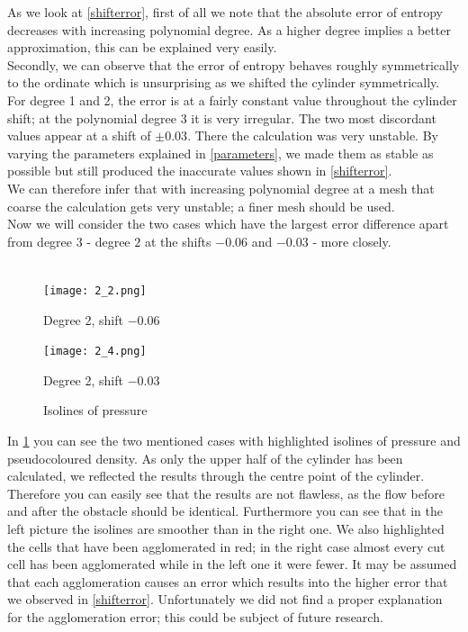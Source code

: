 	As we look at \cref{shifterror}, first of all we note that the absolute error of entropy decreases with increasing polynomial degree. As a higher  degree implies a better approximation, this can be explained very easily. \\ \indent
	Secondly, we can observe that the error of entropy behaves roughly symmetrically to the ordinate which is unsurprising as we shifted the cylinder symmetrically.\\ \indent
	For degree 1 and 2, the error is at a fairly constant value throughout the cylinder shift; at the polynomial degree 3 it is very irregular. The two most discordant values appear at a shift of $\pm 0.03$. There the calculation was very unstable. By varying the parameters explained in \cref{parameters}, we made them as stable as possible but still produced the inaccurate values shown in \cref{shifterror}. \\ \indent
	We can therefore infer that with increasing polynomial degree at a mesh that coarse the calculation gets very unstable; a finer mesh should be used. \\ \indent
	Now we will consider the two cases which have the largest error difference apart from degree 3 - degree $2$ at the shifts $-0.06$ and $-0.03$ - more closely. \\\\
	
	\begin{figure}[htp]
		\centering
		\begin{minipage}[b]{0.5\textwidth}
			\centering
			\texttt{[image: 2\_2.png]}
			\caption*{Degree 2, shift $-0.06$}
			\label{fig:2_2}
		\end{minipage}%
		\begin{minipage}[b]{0.5\textwidth}
			\centering
			\texttt{[image: 2\_4.png]}
			\caption*{Degree 2, shift $-0.03$}
			\label{fig:2_4}
		\end{minipage}
		\caption{Isolines of pressure}\label{fig:isoshift}
	\end{figure}
	
	In \cref{fig:isoshift} you can see the two mentioned cases with highlighted isolines of pressure and pseudocoloured density. As only the upper half of the cylinder has been calculated, we reflected the results through the centre point of the cylinder. Therefore you can easily see that the results are not flawless, as the flow before and after the obstacle should be identical. Furthermore you can see that in the left picture the isolines are smoother than in the right one. We also highlighted the cells that have been agglomerated in red; in the right case almost every cut cell has been agglomerated while in the left one it were fewer. It may be assumed that each agglomeration causes an error which results into the higher error that we observed in \cref{shifterror}. Unfortunately we did not find a proper explanation for the agglomeration error; this could be subject of future research. \\\\ 
	
